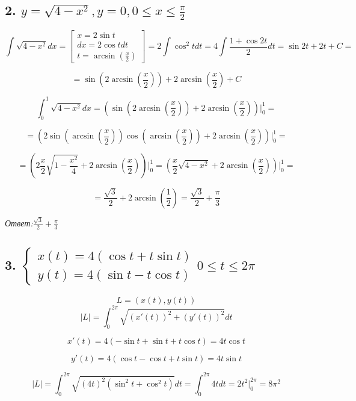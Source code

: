 \documentclass[a4paper]{article}
\begin{document}
\subsection*{2. $y = \sqrt{4-x^2}, y=0, 0 \leq x \leq \frac{\pi}{2}$}

\[ \int \sqrt{4-x^2} dx  = \begin{bmatrix}
x = 2\sin t \\ dx = 2 \cos t dt \\ t = \arcsin(\frac{x}{2})
\end{bmatrix} = 2 \int \cos^2 t dt = 4 \int \frac{1+\cos 2t}{2} dt = \sin 2t + 2t + C =
\] 

\[ = \sin \left( 2 \arcsin \left( \frac{x}{2}\right) \right) + 2 \arcsin \left( \frac{x}{2} \right) + C\]

\[\int_0^1 \sqrt{4-x^2} dx  =
\left( \sin \left( 2 \arcsin \left( \frac{x}{2}\right) \right) + 2 \arcsin \left( \frac{x}{2} \right) \right) \bigg|_0^1 = \]

\[ =  \left( 2 \sin \left( \arcsin \left( \frac{x}{2} \right) \right) \cos \left( \arcsin \left( \frac{x}{2}\right) \right) + 2 \arcsin \left( \frac{x}{2} \right) \right) \bigg|_0^1 = 
\]

\[
= \left( 2 \frac{x}{2} \sqrt{1-\frac{x^2}{4}} + 2 \arcsin \left( \frac{x}{2} \right) \right) \bigg|_0^1
= \left( \frac{x}{2} \sqrt{4-x^2} + 2 \arcsin \left( \frac{x}{2} \right) \right) \bigg|_0^1
=
\]

\[
=
\frac{\sqrt{3}}{2} + 2 \arcsin \left( \frac{1}{2} \right) = \frac{\sqrt{3}}{2} + \frac{\pi}{3}
\]

\textit{Ответ:$\frac{\sqrt{3}}{2} + \frac{\pi}{3}$}

\subsection*{3. $\begin{cases} x(t) = 4( \cos t + t \sin t) \\ y(t) = 4 ( \sin t - t \cos t) \end{cases} 0 \leq t \leq 2 \pi$}

\[L = \left( x(t), y(t) \right)\]
\[|L| = \int_0^{2 \pi} \sqrt{(x'(t))^2 + (y'(t))^2} dt\]


\[ x'(t) = 4(- \sin t + \sin t + t \cos t) = 4 t \cos t\]

\[ y'(t) = 4(\cos t - \cos t + t \sin t) = 4 t \sin t\]

\[ |L| = \int_0^{2 \pi} \sqrt{(4t)^2 (\sin^2 t + \cos^2 t)} dt = \int _0^{2 \pi} 4t dt = 2t^2 \bigg|_0^{2 \pi} = 8 \pi^2 \]
\end{document}
